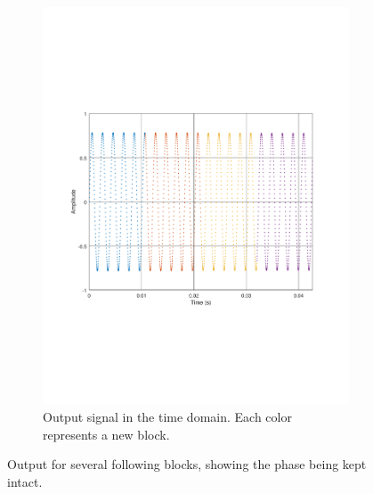 \begin{figure}
\begin{subfigure}[t]{.49\textwidth}
		\includegraphics[width=.9\linewidth, clip, trim={2cm 7cm 2cm 7cm}]{gfx/Modelling/output.pdf}
		\caption{Output signal in the time domain. Each color represents a new block.}
		\label{fig:IFout2}
	\end{subfigure}
	\caption{Output for several following blocks, showing the phase being kept intact.}
	\label{fig:IFoutput}
\end{figure}

\FloatBarrier